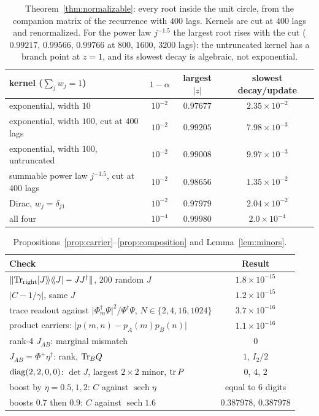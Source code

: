 \documentclass[11pt]{amsart}
\theoremstyle{definition}
\theoremstyle{remark}
\begin{document}
\begin{table}[h]
\centering\small
\begin{tabular}{lccc}
\toprule
kernel ($\sum_jw_j=1$) & $1-\alpha$ & largest $\lvert z\rvert$ & slowest decay/update\\
\midrule
exponential, width $10$ & $10^{-2}$ & $0.97677$ & $2.35\times10^{-2}$\\
exponential, width $100$, cut at $400$ lags & $10^{-2}$ & $0.99205$ & $7.98\times10^{-3}$\\
exponential, width $100$, untruncated & $10^{-2}$ & $0.99008$ & $9.97\times10^{-3}$\\
summable power law $j^{-1.5}$, cut at $400$ lags & $10^{-2}$ & $0.98656$ & $1.35\times10^{-2}$\\
Dirac, $w_j=\delta_{j1}$ & $10^{-2}$ & $0.97979$ & $2.04\times10^{-2}$\\
all four & $10^{-4}$ & $0.99980$ & $2.0\times10^{-4}$\\
\bottomrule
\end{tabular}
\caption{Theorem~\ref{thm:normalizable}: every root inside the unit circle, from the companion matrix of the recurrence with $400$ lags. Kernels are cut at $400$ lags and renormalized. For the power law $j^{-1.5}$ the largest root rises with the cut ($0.99217$, $0.99566$, $0.99766$ at $800$, $1600$, $3200$ lags): the untruncated kernel has a branch point at $z=1$, and its slowest decay is algebraic, not exponential.}
\label{tab:normalizable}
\end{table}

\begin{table}[h]
\centering\small
\begin{tabular}{lc}
\toprule
Check & Result\\
\midrule
$\lVert{\rm Tr}_{\rm right}\lvert J\rangle\!\rangle\langle\!\langle J\rvert-JJ^\dagger\rVert$, 200 random $J$ & $1.8\times10^{-15}$\\
$\lvert C-1/\gamma\rvert$, same $J$ & $1.2\times10^{-15}$\\
trace readout against $\lvert\Phi_m^\dagger\Psi\rvert^2/\Psi^\dagger\Psi$, $N\in\{2,4,16,1024\}$ & $3.7\times10^{-16}$\\
product carriers: $\lvert p(m,n)-p_A(m)p_B(n)\rvert$ & $1.1\times10^{-16}$\\
rank-4 $J_{AB}$: marginal mismatch & $0$\\
$J_{AB}=\Phi^+\eta^\dagger$: rank, ${\rm Tr}_BQ$ & $1$, $I_2/2$\\
${\rm diag}(2,2,0,0)$: $\det J$, largest $2\times2$ minor, ${\rm tr}\,P$ & $0$, $4$, $2$\\
boost by $\eta=0.5,1,2$: $C$ against $\operatorname{sech}\eta$ & equal to $6$ digits\\
boosts $0.7$ then $0.9$: $C$ against $\operatorname{sech}1.6$ & $0.387978$, $0.387978$\\
\bottomrule
\end{tabular}
\caption{Propositions~\ref{prop:carrier}--\ref{prop:composition} and Lemma~\ref{lem:minors}.}
\label{tab:readout}
\end{table}
\end{document}
